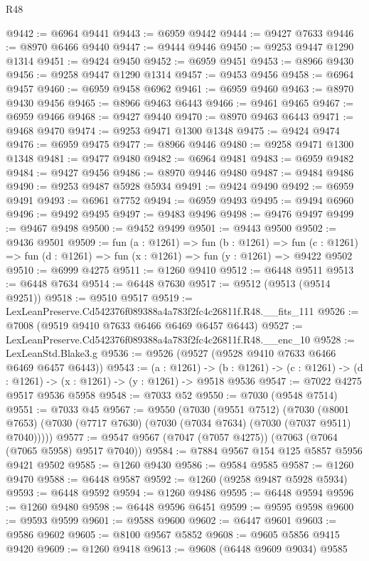 \begin{lexlean}{R48}
\begin{coremodule}
@9442 := @6964 @9441
@9443 := @6959 @9442
@9444 := @9427 @7633
@9446 := @8970 @6466 @9440
@9447 := @9444 @9446
@9450 := @9253 @9447 @1290 @1314
@9451 := @9424 @9450
@9452 := @6959 @9451
@9453 := @8966 @9430
@9456 := @9258 @9447 @1290 @1314
@9457 := @9453 @9456
@9458 := @6964 @9457
@9460 := @6959 @9458 @6962
@9461 := @6959 @9460
@9463 := @8970 @9430 @9456
@9465 := @8966 @9463 @6443
@9466 := @9461 @9465
@9467 := @6959 @9466
@9468 := @9427 @9440
@9470 := @8970 @9463 @6443
@9471 := @9468 @9470
@9474 := @9253 @9471 @1300 @1348
@9475 := @9424 @9474
@9476 := @6959 @9475
@9477 := @8966 @9446
@9480 := @9258 @9471 @1300 @1348
@9481 := @9477 @9480
@9482 := @6964 @9481
@9483 := @6959 @9482
@9484 := @9427 @9456
@9486 := @8970 @9446 @9480
@9487 := @9484 @9486
@9490 := @9253 @9487 @5928 @5934
@9491 := @9424 @9490
@9492 := @6959 @9491
@9493 := @6961 @7752
@9494 := @6959 @9493
@9495 := @9494 @6960
@9496 := @9492 @9495
@9497 := @9483 @9496
@9498 := @9476 @9497
@9499 := @9467 @9498
@9500 := @9452 @9499
@9501 := @9443 @9500
@9502 := @9436 @9501
@9509 := fun (a : @1261) =>
  fun (b : @1261) =>
  fun (c : @1261) => fun (d : @1261) => fun (x : @1261) => fun (y : @1261) => @9422 @9502
@9510 := @6999 @4275
@9511 := @1260 @9410
@9512 := @6448 @9511
@9513 := @6448 @7634
@9514 := @6448 @7630
@9517 := @9512 (@9513 (@9514 @9251))
@9518 := @9510 @9517
@9519 := LexLeanPreserve.Cd542376f089388a4a783f2fc4c26811f.R48.__fits_111
@9526 := @7008 (@9519 @9410 @7633 @6466 @6469 @6457 @6443)
@9527 := LexLeanPreserve.Cd542376f089388a4a783f2fc4c26811f.R48.__enc_10
@9528 := LexLeanStd.Blake3.g
@9536 := @9526 (@9527 (@9528 @9410 @7633 @6466 @6469 @6457 @6443))
@9543 := (a : @1261) ->
  (b : @1261) -> (c : @1261) -> (d : @1261) -> (x : @1261) -> (y : @1261) -> @9518 @9536
@9547 := @7022 @4275 @9517 @9536 @5958
@9548 := @7033 @52
@9550 := @7030 (@9548 @7514)
@9551 := @7033 @45
@9567 := @9550
    (@7030
      (@9551 @7512)
      (@7030 (@8001 @7653) (@7030 (@7717 @7630) (@7030 (@7034 @7634) (@7030 (@7037 @9511) @7040)))))
@9577 := @9547 @9567 (@7047 (@7057 @4275)) (@7063 (@7064 (@7065 @5958) @9517 @7040))
@9584 := @7884 @9567 @154 @125 @5857 @5956 @9421 @9502
@9585 := @1260 @9430
@9586 := @9584 @9585
@9587 := @1260 @9470
@9588 := @6448 @9587
@9592 := @1260 (@9258 @9487 @5928 @5934)
@9593 := @6448 @9592
@9594 := @1260 @9486
@9595 := @6448 @9594
@9596 := @1260 @9480
@9598 := @6448 @9596 @6451
@9599 := @9595 @9598
@9600 := @9593 @9599
@9601 := @9588 @9600
@9602 := @6447 @9601
@9603 := @9586 @9602
@9605 := @8100 @9567 @5852
@9608 := @9605 @5856 @9415 @9420
@9609 := @1260 @9418
@9613 := @9608 (@6448 @9609 @9034) @9585

\end{coremodule}
\end{lexlean}
